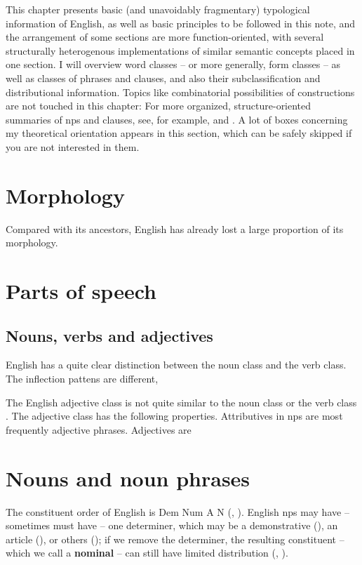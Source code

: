 \documentclass[UTF8, a4paper, oneside, scheme=plain]{ctexrep}
\newcommand*{\citepage}[1]{p.~{#1}}
\newcommand*{\concept}[1]{\textbf{#1}}
\begin{document}
This chapter presents basic (and unavoidably fragmentary) typological information of English,
as well as basic principles to be followed in this note,
and the arrangement of some sections are more function-oriented, 
with several structurally heterogenous implementations of 
similar semantic concepts placed in one section.
I will overview word classes -- or more generally, form classes -- 
as well as classes of phrases and clauses,
and also their subclassification and distributional information.
Topics like combinatorial possibilities of constructions
are not touched in this chapter:
For more organized, structure-oriented summaries of 
\acs{np}s and clauses, 
see, for example,  and .
A lot of boxes concerning my theoretical orientation appears in this section,
which can be safely skipped if you are not interested in them.

\section{Morphology}

Compared with its ancestors, 
English has already lost a large proportion of its morphology.


\section{Parts of speech}


\subsection{Nouns, verbs and adjectives}

English has a quite clear distinction between the noun class and the verb class.
The inflection pattens are different, 

The English adjective class is not quite similar to the noun class or the verb class 
\citep[\citepage{73}]{dixon2010basic2}.
The adjective class has the following properties.
Attributives in \acs{np}s are most frequently adjective phrases.
Adjectives are 

\section{Nouns and noun phrases}\label{sec:overview.np}

The constituent order of English is Dem Num A N
(, ). 
English \acs{np}s may have -- sometimes must have -- 
one determiner, 
which may be a demonstrative (),
an article (),
or others ();
if we remove the determiner, 
the resulting constituent -- which we call a \concept{nominal} -- 
can still have limited distribution (, ).
\end{document}
